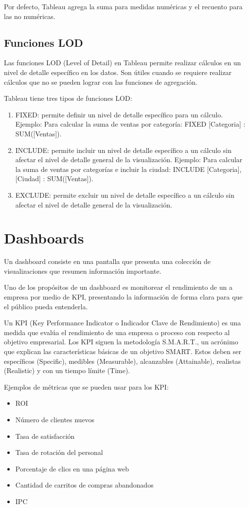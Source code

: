 \documentclass[a4paper, 12pt]{book}
\begin{document}
Por defecto, Tableau agrega la suma para medidas numéricas y el recuento para las no numéricas.
\subsection{Funciones LOD}
Las funciones LOD (Level of Detail) en Tableau permite realizar cálculos en un nivel de detalle específico en los datos. Son útiles cuando se requiere realizar cálculos que no se pueden lograr con las funciones de agregación.

Tableau tiene tres tipos de funciones LOD:
\begin{enumerate}
	\item FIXED: permite definir un nivel de detalle específico para un cálculo. Ejemplo: Para calcular la suma de ventas por categoría: {FIXED [Categoria] : SUM([Ventas])}.
	\item INCLUDE: permite incluir un nivel de detalle específico a un cálculo sin afectar el nivel de detalle general de la visualización. Ejemplo: Para calcular la suma de ventas por categorías e incluir la ciudad: {INCLUDE [Categoria],[Ciudad] : SUM([Ventas])}.
	\item EXCLUDE: permite excluir un nivel de detalle específico a un cálculo sin afectar el nivel de detalle general de la visualización.
\end{enumerate}

\section{Dashboards}
Un dashboard consiste en una pantalla que presenta una colección de visualizaciones que resumen información importante.

Uno de los propósitos de un dashboard es monitorear el rendimiento de un a empresa por medio de KPI, presentando la información de forma clara para que el público pueda entenderla.

Un KPI (Key Performance Indicator o Indicador Clave de Rendimiento) es una medida que evalúa el rendimiento de una empresa o proceso con respecto al objetivo empresarial. Los KPI siguen la metodología S.M.A.R.T., un acrónimo que explican las características básicas de un objetivo SMART. Estos deben ser específicos (Specific), medibles (Measurable), alcanzables (Attainable), realistas (Realistic) y con un tiempo límite (Time).

Ejemplos de métricas que se pueden usar para los KPI:
\begin{itemize}
	\item ROI
	\item Número de clientes nuevos
	\item Tasa de satisfacción
	\item Tasa de rotación del personal
	\item Porcentaje de clics en una página web
	\item Cantidad de carritos de compras abandonados
	\item IPC
\end{itemize}
\end{document}
